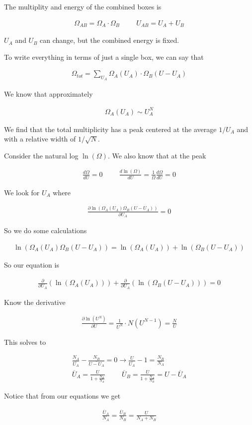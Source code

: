 \documentclass[fleqn]{report}
\newcommand{\hp}{\hspace{1cm}}
\newcommand{\del}{\partial}
\newcommand{\equations} [1] {
\begin{gather*}
#1
\end{gather*}
}
\begin{document}
The multiplity and energy of the combined boxes is 
\equations{
    \Omega_{AB}
    =
    \Omega_{A}
    \cdot
    \Omega_{B}
    \hp 
    U_{AB}
    =
    U_{A}
    +
    U_{B}
}

$U_A$ and $U_B$ can change, but the combined energy is fixed. 

To write everything in terms of just a single box, we can say that 

\equations{
    \Omega_{tot}
    =
    \sum_{U_A}
    \Omega_A(U_A)
    \cdot
    \Omega_B(U - U_A)
}

We know that approximately 

\equations{
    \Omega_A(U_A)
    \sim
    U_A^N
}

We find that the total multiplicity has a peak centered at
the average $1/U_A$ and with a relative width of $1/\sqrt{N}$.

Consider the natural log $\ln(\Omega)$.
We also know that at the peak

\equations{
    \frac{d \Omega}{d U}
    =
    0
    \hp 
    \frac{d \ln(\Omega)}{d U}
    =
    \frac{1}{\Omega}
    \frac{d \Omega}{d U}
    = 
    0
}


We look for $U_A$ where 
\equations{
    \frac{\del \ln(\Omega_A(U_A) \Omega_B(U - U_A))}{\del U_A}
    =
    0
}
So we do some calculations 

\equations{
    \ln(\Omega_A(U_A) 
    \Omega_B(U - U_A)) 
    =
    \ln(\Omega_A(U_A))
    +
    \ln(\Omega_B(U - U_A)) 
}

So our equation is 

\equations{
    \frac{\del}{\del U_A}
    \left(
        \ln(\Omega_A(U_A))
    \right)
    +
    \frac{\del}{\del U_A}
    \left(
        \ln(\Omega_B(U - U_A))
    \right)
    =
    0
}

Know the derivative 
\equations{
    \frac{\del \ln(U^N)}{\del U}
    =
    \frac{1}{U^N}
    \cdot 
    N (U^{N-1})
    =
    \frac{N}{U}
}

This solves to 

\equations{
    \frac{N_A}{\bar{U_A}}
    -
    \frac{N_B}{\bar{U - U_A}}
    =
    0
    \rightarrow 
    \frac{U}{\bar{U_A}}
    -
    1
    =
    \frac{N_B}{N_A}
    \\
    \overline U_A
    =
    \frac{U}{1 + \frac{N_B}{N_A}}
    \hp 
    \overline{U}_B
    =
    \frac{U}{1 + \frac{N_A}{N_B}}
    =
    U - \overline U_A
}

Notice that from our equations we get 
\equations{
    \frac{\overline U_A}{N_A}
    =
    \frac{\overline U_B}{N_B}
    =
    \frac{U}{N_A + N_B}
}
\end{document}
